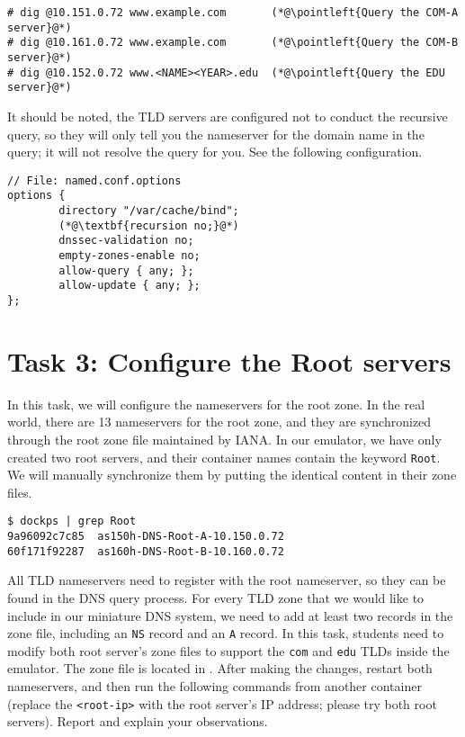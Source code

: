 \begin{lstlisting}
# dig @10.151.0.72 www.example.com       (*@\pointleft{Query the COM-A server}@*) 
# dig @10.161.0.72 www.example.com       (*@\pointleft{Query the COM-B server}@*) 
# dig @10.152.0.72 www.<NAME><YEAR>.edu  (*@\pointleft{Query the EDU server}@*) 
\end{lstlisting}



It should be noted, the TLD servers are configured
not to conduct the recursive query, so they will only tell you
the nameserver for the domain name in the query; it will not
resolve the query for you.  See the following configuration.

\begin{lstlisting}
// File: named.conf.options
options {
        directory "/var/cache/bind";
        (*@\textbf{recursion no;}@*)  
        dnssec-validation no;
        empty-zones-enable no;
        allow-query { any; };
        allow-update { any; };
};
\end{lstlisting}
 


\section{Task 3: Configure the Root servers}

In this task, we will configure the nameservers for the root zone. 
In the real world, there are 13 nameservers for the root zone,
and they are synchronized through the root zone file maintained by IANA. 
In our emulator, we have only created two root servers, 
and their container names contain the keyword \texttt{Root}. 
We will manually synchronize them by putting the identical content 
in their zone files. 

\begin{lstlisting}
$ dockps | grep Root
9a96092c7c85  as150h-DNS-Root-A-10.150.0.72
60f171f92287  as160h-DNS-Root-B-10.160.0.72
\end{lstlisting}
 

All TLD nameservers need to register
with the root nameserver, so they can be found
in the DNS query process.
For every TLD zone that we would like to include in our
miniature DNS system, we need to add at least two records
in the zone file, including an \texttt{NS} record
and an \texttt{A} record.  In this task, students need to
modify both root server's zone files to support the 
\texttt{com} and \texttt{edu} TLDs inside the emulator. 
The zone file is located in .
After making the changes, restart both nameservers, 
and then run the following commands from another container (replace
the \texttt{<root-ip>} with the root server's IP address;
please try both root servers). 
Report and explain your observations. 

